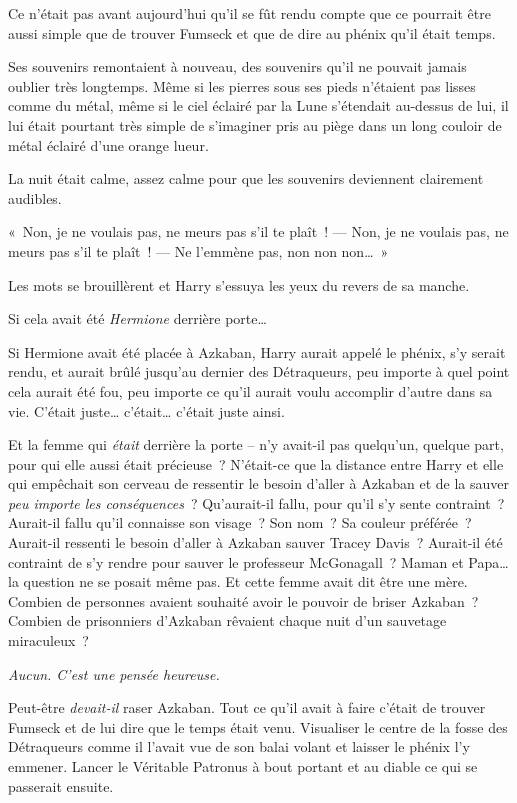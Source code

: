 Ce n'était pas avant aujourd'hui qu'il se fût rendu compte que ce pourrait être aussi simple que de trouver Fumseck et que de dire au phénix qu'il était temps.

Ses souvenirs remontaient à nouveau, des souvenirs qu'il ne pouvait jamais oublier très longtemps. Même si les pierres sous ses pieds n'étaient pas lisses comme du métal, même si le ciel éclairé par la Lune s'étendait au-dessus de lui, il lui était pourtant très simple de s'imaginer pris au piège dans un long couloir de métal éclairé d'une orange lueur.

La nuit était calme, assez calme pour que les souvenirs deviennent clairement audibles.

«~Non, je ne voulais pas, ne meurs pas s'il te plaît~!
---  Non, je ne voulais pas, ne meurs pas s'il te plaît~!
---  Ne l'emmène pas, non non non…~»

Les mots se brouillèrent et Harry s'essuya les yeux du revers de sa manche.

Si cela avait été \emph{Hermione} derrière porte…

Si Hermione avait été placée à Azkaban, Harry aurait appelé le phénix, s'y serait rendu, et aurait brûlé jusqu'au dernier des Détraqueurs, peu importe à quel point cela aurait été fou, peu importe ce qu'il aurait voulu accomplir d'autre dans sa vie. C'était juste… c'était… c'était juste ainsi.

Et la femme qui \emph{était} derrière la porte -- n'y avait-il pas quelqu'un, quelque part, pour qui elle aussi était précieuse~? N'était-ce que la distance entre Harry et elle qui empêchait son cerveau de ressentir le besoin d'aller à Azkaban et de la sauver \emph{peu importe les conséquences}~? Qu'aurait-il fallu, pour qu'il s'y sente contraint~? Aurait-il fallu qu'il connaisse son visage~? Son nom~? Sa couleur préférée~? Aurait-il ressenti le besoin d'aller à Azkaban sauver Tracey Davis~? Aurait-il été contraint de s'y rendre pour sauver le professeur McGonagall~? Maman et Papa… la question ne se posait même pas. Et cette femme avait dit être une mère. Combien de personnes avaient souhaité avoir le pouvoir de briser Azkaban~? Combien de prisonniers d'Azkaban rêvaient chaque nuit d'un sauvetage miraculeux~?

\emph{Aucun. C'est une pensée heureuse.}

Peut-être \emph{devait-il} raser Azkaban. Tout ce qu'il avait à faire c'était de trouver Fumseck et de lui dire que le temps était venu. Visualiser le centre de la fosse des Détraqueurs comme il l'avait vue de son balai volant et laisser le phénix l'y emmener. Lancer le Véritable Patronus à bout portant et au diable ce qui se passerait ensuite.

